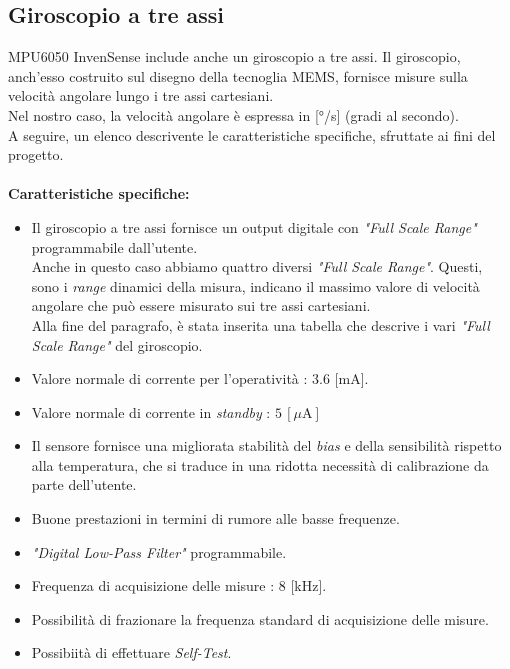 \documentclass[11pt]{report}
\begin{document}
\subsection{Giroscopio a tre assi}
MPU6050 InvenSense include anche un giroscopio a tre assi. Il giroscopio, anch'esso costruito sul disegno della tecnoglia MEMS, fornisce misure sulla velocità angolare lungo i tre assi cartesiani.\\
Nel nostro caso, la velocità angolare è espressa in [°/s] (gradi al secondo).\\
A seguire, un elenco descrivente le caratteristiche specifiche, sfruttate ai fini del progetto.\\\\
\textbf{Caratteristiche specifiche:}
\begin{itemize}
\item Il giroscopio a tre assi fornisce un output digitale con \textit{"Full Scale Range"} programmabile dall'utente.\\Anche in questo caso abbiamo quattro diversi \textit{"Full Scale Range"}. Questi, sono i \textit{range} dinamici della misura, indicano il massimo valore di velocità angolare che può essere misurato sui tre assi cartesiani.\\Alla fine del paragrafo, è stata inserita una tabella che descrive i vari \textit{"Full Scale Range"} del giroscopio.
\item Valore normale di corrente per l'operatività : 3.6 [mA].
\item Valore normale di corrente in \textit{standby} : $5\,[\mu\text{A}]$
\item Il sensore fornisce una migliorata stabilità del \textit{bias} e della sensibilità rispetto alla temperatura, che si traduce in una ridotta necessità di calibrazione da parte dell'utente.
\item Buone prestazioni in termini di rumore alle basse frequenze.
\item \textit{"Digital Low-Pass Filter"} programmabile.
\item Frequenza di acquisizione delle misure : 8 [kHz].
\item Possibilità di frazionare la frequenza standard di acquisizione delle misure.
\item Possibiità di effettuare \textit{Self-Test}.
\end{itemize}
\end{document}
